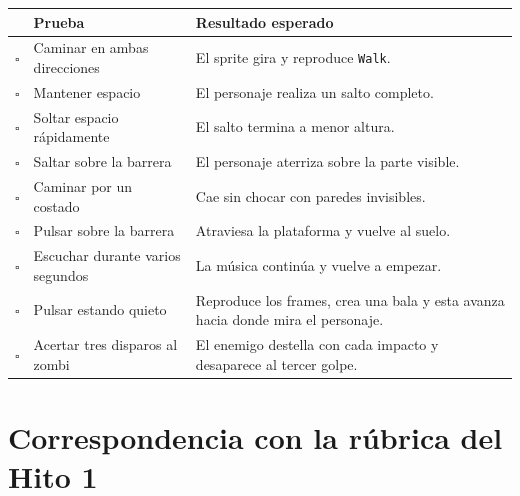 \documentclass[11pt,a4paper]{article}
\newcommand{\keycap}[1]{\fcolorbox{metalBlue}{softGray}{\texttt{#1}}}
\begin{document}
\begin{tabularx}{\textwidth}{p{}X X}
\toprule
 & Prueba & Resultado esperado \\
\midrule
$\square$ & Caminar en ambas direcciones & El sprite gira y reproduce \texttt{Walk}. \\
$\square$ & Mantener espacio & El personaje realiza un salto completo. \\
$\square$ & Soltar espacio rápidamente & El salto termina a menor altura. \\
$\square$ & Saltar sobre la barrera & El personaje aterriza sobre la parte visible. \\
$\square$ & Caminar por un costado & Cae sin chocar con paredes invisibles. \\
$\square$ & Pulsar \keycap{S} sobre la barrera & Atraviesa la plataforma y vuelve al suelo. \\
$\square$ & Escuchar durante varios segundos & La música continúa y vuelve a empezar. \\
$\square$ & Pulsar \keycap{F} estando quieto & Reproduce los frames, crea una bala y esta avanza hacia donde mira el personaje. \\
$\square$ & Acertar tres disparos al zombi & El enemigo destella con cada impacto y desaparece al tercer golpe. \\
\bottomrule
\end{tabularx}

\section{Correspondencia con la rúbrica del Hito 1}
\end{document}
